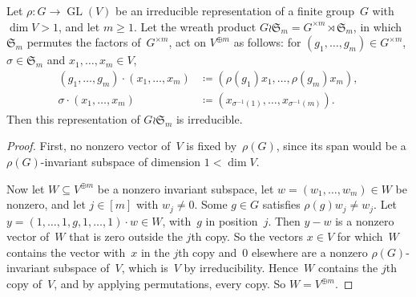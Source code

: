 \documentclass[11pt,letterpaper]{article}
\DeclareMathOperator{\GL}{GL}
\begin{document}
\begin{lemma}\label{lem:wreath-irred}
Let $\rho : G \to \GL(V)$ be an irreducible representation of a finite group~$G$ with $\dim V > 1$, and let $m \geq 1$. Let the wreath product $G \wr \mathfrak{S}_m = G^{\times m} \rtimes \mathfrak{S}_m$, in which~$\mathfrak{S}_m$ permutes the factors of~$G^{\times m}$, act on $V^{\oplus m}$ as follows: for $(g_1, \ldots, g_m) \in G^{\times m}$, $\sigma \in \mathfrak{S}_m$ and $x_1, \ldots, x_m \in V$,
\begin{align*}
(g_1, \ldots, g_m) \cdot (x_1, \ldots, x_m) &\coloneqq (\rho(g_1) x_1, \ldots, \rho(g_m) x_m),\\
\sigma \cdot (x_1, \ldots, x_m) &\coloneqq (x_{\sigma^{-1}(1)}, \ldots, x_{\sigma^{-1}(m)}).
\end{align*}
Then this representation of $G \wr \mathfrak{S}_m$ is irreducible.
\end{lemma}
\begin{proof}
First, no nonzero vector of~$V$ is fixed by~$\rho(G)$, since its span would be a $\rho(G)$-invariant subspace of dimension $1 < \dim V$.

Now let $W \subseteq V^{\oplus m}$ be a nonzero invariant subspace, let $w = (w_1, \ldots, w_m) \in W$ be nonzero, and let $j \in [m]$ with $w_j \neq 0$. Some $g \in G$ satisfies $\rho(g) w_j \neq w_j$. Let $y = (1, \ldots, 1, g, 1, \ldots, 1) \cdot w \in W$, with~$g$ in position~$j$. Then $y - w$ is a nonzero vector of~$W$ that is zero outside the $j$th copy. So the vectors $x \in V$ for which~$W$ contains the vector with~$x$ in the $j$th copy and~$0$ elsewhere are a nonzero $\rho(G)$-invariant subspace of~$V$, which is~$V$ by irreducibility. Hence~$W$ contains the $j$th copy of~$V$, and by applying permutations, every copy. So $W = V^{\oplus m}$.
\end{proof}
\end{document}
